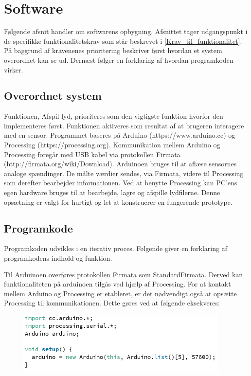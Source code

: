 \chapter{Software}
\label{software}
Følgende afsnit handler om softwarens opbygning. Afsnittet tager udgangspunkt i de specifikke funktionalitetskrav som står beskrevet i \autoref{Krav_til_funktionalitet}. På baggrund af kravenenes prioritering beskriver først hvordan et system overordnet kan se ud. Dernæst følger en  forklaring af hvordan programkoden virker.
 
\section{Overordnet system}
Funktionen, Afspil lyd, prioriteres som den vigtigste funktion hvorfor den implementeres først. Funktionen aktiveres som resultat af at brugeren interagere med en sensor.   
Programmet baseres på Arduino (https://www.arduino.cc) og Processing (https://processing.org). Kommunikation mellem Arduino og Processing foregår med USB kabel via protokollen Firmata (http://firmata.org/wiki/Download). 
 Arduinoen bruges til at aflæse sensornes analoge spændinger. De målte værdier sendes, via Firmata, videre til Processing som derefter bearbejder informationen.
 Ved at benytte Processing kan PC'ens egen hardware bruges til at bearbejde, lagre og afspille lydfilerne. Denne opsætning er valgt for hurtigt og let at konstruerer en fungerende prototype.  

\section{Programkode}
Programkoden udvikles i en iterativ proces. Følgende giver en forklaring af programkodens indhold og funktion.  

Til Arduinoen overføres protokollen Firmata som StandardFirmata. Derved kan funktionaliteten på arduinoen tilgås ved hjælp af Processing. For at  kontakt mellem Arduino og Processing er etableret, er det nødvendigt også at opsætte Processing til kommunikationen. Dette gøres ved at følgende eksekveres:

\begin{figure}
\includegraphics[scale=0.8]{Figure/programkode01.png}
\end{figure}
  
